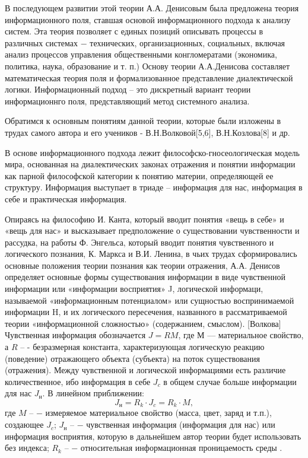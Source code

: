 \documentclass[a4paper,12pt]{report}
\begin{document}
	В последующем развитии этой теории А.А. Денисовым была предложена теория информационного поля, ставшая основой информационного подхода к анализу систем. Эта теория позволяет с единых позиций описывать процессы в различных системах − технических, организационных, социальных, включая анализ процессов управления общественными конгломератами (экономика, политика, наука, образование и т. п.) Основу теории А.А.Денисова составляет математическая теория поля и формализованное представление диалектической логики. Информационный подход – это дискретный вариант теории информационнго поля, представляющий метод системного анализа.
	
	Обратимся к основным понятиям данной теории, которые были изложены в трудах самого автора и его учеников - В.Н.Волковой[5,6], В.Н.Козлова[8] и др.
	
	В основе информационного подхода лежит философско-гносеологическая модель мира, основанная на диалектических законах отражения и понятии информации как парной философской категории к понятию материи, определяющей ее структуру. Информация выступает в триаде – информация для нас, информация в себе и практическая информация.
	
Опираясь на философию И. Канта, который вводит понятия «вещь в себе» и «вещь для нас» и высказывает предположение о существовании чувственности и рассудка, на работы Ф. Энгельса, который вводит понятия чувственного и логического познания, К. Маркса и В.И. Ленина, в чьих трудах сформировались основные положения теории познания как теории отражения, А.А. Денисов определяет основные формы существования информации в виде чувственной информации или «информации восприятия» J, логической информаци, называемой «информационным потенциалом» или сущностью воспринимаемой информации H, и их логического пересечения, названного в рассматриваемой теории «информационной сложностью» (содержанием, смыслом). [Волкова] Чувственная информация обозначается $J = RM$, где $М \mbox{ –}$– материальное свойство, а $R \mbox{ –}$ - безразмерная константа, характеризующая логическую реакцию (поведение) отражающего объекта (субъекта) на поток существования (отражения). Между чувственной и логической информациями есть различие количественное, ибо информация в себе $J_c$ в общем случае больше информации для нас $J_н$. В линейном приближении: \\
\begin{equation}
\label{trivial}
	 J_н = R_k \cdot J_c  = R_k \cdot M,                                          				          
\end{equation}
где $M \mbox{ –} $ − измеряемое материальное свойство (масса, цвет, заряд и т.п.), создающее $J_c$; $J_н \mbox{ –}$ − чувственная информация (информация для нас) или информация восприятия, которую в дальнейшем автор теории будет использовать без индекса; $R_k \mbox{ –}$ − относительная информационная проницаемость среды .\\
\end{document}
